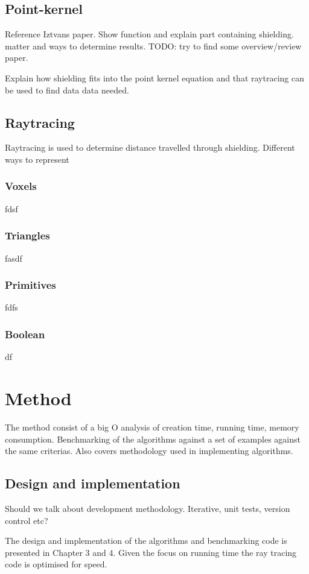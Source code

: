 \documentclass[11pt,twoside,a4paper]{report}
\begin{document}
\section{Point-kernel}
Reference Iztvans paper. Show function and explain part containing shielding.
matter and ways to determine results. TODO: try to find some overview/review paper.

Explain how shielding fits into the point kernel equation and that raytracing can be used to find data data needed.

\section{Raytracing}
Raytracing is used to determine distance travelled through shielding. Different ways to represent 
\subsection{Voxels}
fdsf
\subsection{Triangles}
fasdf
\subsection{Primitives}
fdfs
\subsection{Boolean}
df


\chapter{Method}

The method consist of a big O analysis of creation time, running time, memory consumption. Benchmarking of the algorithms against a set of examples against the same criterias. Also covers methodology used in implementing algorithms.

\section{Design and implementation}
Should we talk about development methodology. Iterative, unit tests, version control etc?

The design and implementation of the algorithms and benchmarking code is presented in Chapter 3 and 4. Given the focus on running time the ray tracing code is optimised for speed. 
\end{document}
